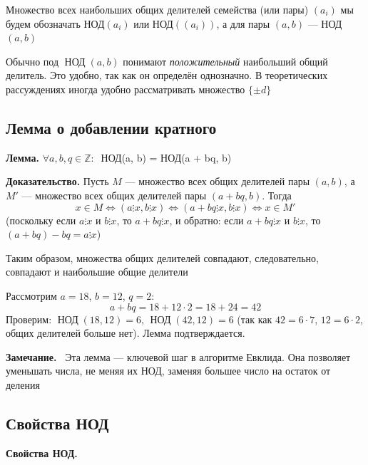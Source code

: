 \documentclass[a4paper,12pt]{article}
\newcommand{\myremark}{\textbf{Замечание.}\ }
\theoremstyle{definition}
\theoremstyle{plain}
\theoremstyle{remark}
\begin{document}
	Множество всех наибольших общих делителей семейства (или пары) $(a_i)$ мы будем обозначать НОД$(a_i)$ или НОД$((a_i))$, а для пары $(a, b)$ — НОД$(a, b)$
	
	\begin{tcolorbox}[colback=yellow!5, colframe=orange!60!black, title=Замечание об обозначениях]
		Обычно под $\operatorname{НОД}(a, b)$ понимают \textit{положительный} наибольший общий делитель. Это удобно, так как он определён однозначно. В теоретических рассуждениях иногда удобно рассматривать множество $\{\pm d\}$
	\end{tcolorbox}
	
	\subsection{Лемма о добавлении кратного}
	
	\noindent \textbf{Лемма.}
	$\forall a, b, q \in \mathbb{Z}: \medspace$ НОД(a, b) = НОД(a + bq, b)
	
	
	\medskip
	\noindent \textbf{Доказательство.}
	Пусть $M$ — множество всех общих делителей пары $(a, b)$, а $M'$ — множество всех общих делителей пары $(a + bq, b)$. Тогда
	\[
	x \in M \iff (a \vdots x, b \vdots x) \iff (a + bq \vdots x, b \vdots x) \iff x \in M'
	\]
	(поскольку если $a \vdots x$ и $b \vdots x$, то $a + bq \vdots x$, и обратно: если $a + bq \vdots x$ и $b \vdots x$, то $(a + bq) - bq = a \vdots x$)
	
	Таким образом, множества общих делителей совпадают, следовательно, совпадают и наибольшие общие делители
	
	\begin{tcolorbox}[colback=blue!5, colframe=blue!40!black, title=Пример]
		Рассмотрим $a = 18$, $b = 12$, $q = 2$:
		\[
		a + bq = 18 + 12 \cdot 2 = 18 + 24 = 42
		\]
		Проверим: $\operatorname{НОД}(18, 12) = 6$, $\operatorname{НОД}(42, 12) = 6$ (так как $42 = 6 \cdot 7$, $12 = 6 \cdot 2$, общих делителей больше нет). Лемма подтверждается.
	\end{tcolorbox}
	
	\myremark
	Эта лемма — ключевой шаг в алгоритме Евклида. Она позволяет уменьшать числа, не меняя их НОД, заменяя большее число на остаток от деления
	
	\subsection{Свойства НОД}
	
	\noindent \textbf{Свойства НОД.}
	
\end{document}
